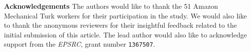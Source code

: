 \begin{abstract}
\end{abstract}








\vspace*{4mm}
\noindent\textbf{Acknowledgements} The authors would like to thank the 51 Amazon Mechanical Turk workers for their participation in the study. We would also like to thank the anonymous reviewers for their insightful feedback related to the initial submission of this article. The lead author would also like to acknowledge support from the \emph{EPSRC}, grant number \texttt{1367507}.

%
 






%
%



